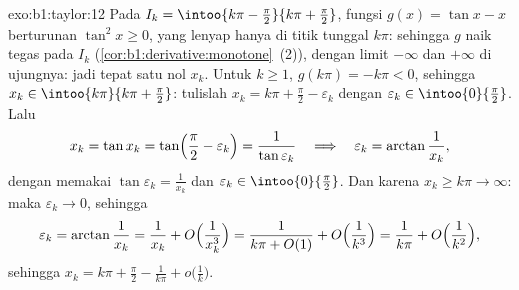 \begin{solution}{exo:b1:taylor:12}
Pada $I_k = \intoo{k\pi - \frac\pi2}{k\pi + \frac\pi2}$, fungsi
$g(x) = \tan x - x$ berturunan $\tan^2 x \geq 0$,
yang lenyap hanya di titik tunggal $k\pi$: sehingga $g$ naik
tegas pada $I_k$ (\cref{cor:b1:derivative:monotone}~(2)),
dengan limit $-\infty$ dan $+\infty$ di ujungnya: jadi tepat satu
nol $x_k$. Untuk $k \geq 1$, $g(k\pi) = -k\pi < 0$, sehingga $x_k \in
\intoo{k\pi}{k\pi + \frac\pi2}$: tulislah $x_k = k\pi + \frac\pi2 -
\varepsilon_k$ dengan $\varepsilon_k \in \intoo{0}{\frac\pi2}$.
Lalu
\[
x_k = \tan x_k = \tan\Bigl(\frac\pi2 - \varepsilon_k\Bigr)
= \frac{1}{\tan\varepsilon_k}
\quad\Longrightarrow\quad
\varepsilon_k = \arctan\frac{1}{x_k} ,
\]
dengan memakai $\tan\varepsilon_k = \frac{1}{x_k}$ dan $\varepsilon_k \in
\intoo{0}{\frac\pi2}$. Dan karena $x_k \geq k\pi \to \infty$:
maka $\varepsilon_k \to 0$, sehingga
\[
\varepsilon_k = \arctan\frac{1}{x_k} = \frac{1}{x_k} +
O\Bigl(\frac{1}{x_k^3}\Bigr)
= \frac{1}{k\pi + O(1)} + O\Bigl(\frac{1}{k^3}\Bigr)
= \frac{1}{k\pi} + O\Bigl(\frac{1}{k^2}\Bigr) ,
\]
sehingga $x_k = k\pi + \frac\pi2 - \frac{1}{k\pi} +
o\bigl(\frac1k\bigr)$.
\end{solution}

